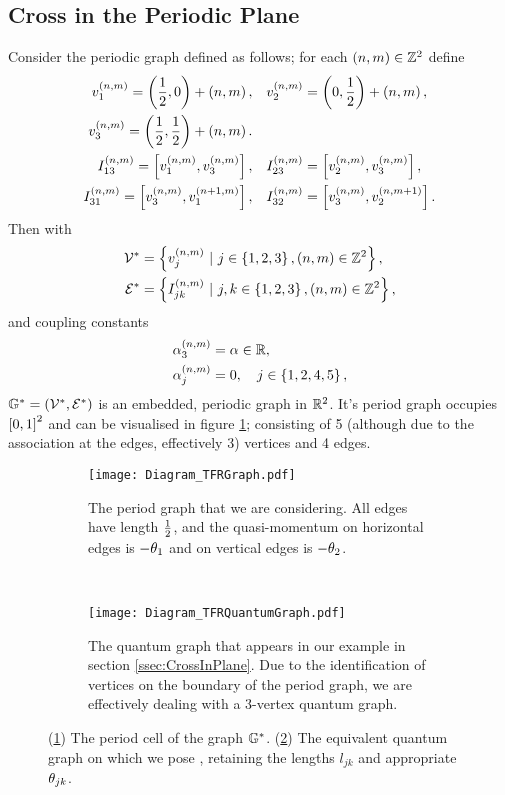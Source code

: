 \subsection{Cross in the Periodic Plane} \label{ssec:ExampleCrossInPlane}
Consider the periodic graph defined as follows; for each $\left( n,m \right)\in\mathbb{Z}^2$ define
\begin{align*}
	v_1^{\left( n,m \right)} = \left( \frac{1}{2},0 \right) + \left( n,m \right), 
	&\quad v_2^{\left( n,m \right)} = \left( 0,\frac{1}{2} \right) + \left( n,m \right), \\
	v_3^{\left( n,m \right)} = \left( \frac{1}{2},\frac{1}{2} \right) + \left( n,m \right). & \\
	I_{13}^{\left( n,m \right)} = \left[ v_1^{\left( n,m \right)}, v_3^{\left( n,m \right)} \right],
	&\quad I_{23}^{\left( n,m \right)} = \left[ v_2^{\left( n,m \right)}, v_3^{\left( n,m \right)} \right], \\
	I_{31}^{\left( n,m \right)} = \left[ v_3^{\left( n,m \right)}, v_1^{\left( n+1,m \right)} \right],
	&\quad I_{32}^{\left( n,m \right)} = \left[ v_3^{\left( n,m \right)}, v_2^{\left( n,m+1 \right)} \right].
\end{align*}
Then with 
\begin{align*}
	\vertSet^* &= \clbracs{v_j^{\bracs{n,m}} \ \vert \ j\in\clbracs{1,2,3}, \bracs{n,m}\in\integers^2}, \\
	\edgeSet^* &= \clbracs{I_{jk}^{\bracs{n,m}} \ \vert \ j,k\in\clbracs{1,2,3}, \bracs{n,m}\in\integers^2},
\end{align*}
and coupling constants
\begin{align*}
	\alpha_3^{\left( n,m \right)} &= \alpha \in\mathbb{R}, \\
	\alpha_j^{\left( n,m \right)} &= 0, \quad j\in\left\{ 1,2,4,5 \right\},
\end{align*}
$\mathbb{G}^* = \left( \mathcal{V}^*,\mathcal{E}^* \right)$ is an embedded, periodic graph in $\mathbb{R}^2$.
It's period graph occupies $\left[ 0,1 \right]^2$ and can be visualised in figure \ref{fig:Diagram_TFRGraph}; consisting of 5 (although due to the association at the edges, effectively 3) vertices and 4 edges.
\begin{figure}[b!]
	\centering
	\begin{subfigure}[t]{0.45\textwidth}
		\centering
		\texttt{[image: Diagram\_TFRGraph.pdf]}
		\caption{\label{fig:Diagram_TFRGraph} The period graph that we are considering. All edges have length $\frac{1}{2}$, and the quasi-momentum on horizontal edges is $-\theta_1$ and on vertical edges is $-\theta_2$.}
	\end{subfigure}
	~
	\begin{subfigure}[t]{0.45\textwidth}
		\centering
		\texttt{[image: Diagram\_TFRQuantumGraph.pdf]}
		\caption{\label{fig:Diagram_TFRQuantumGraph} The quantum graph that appears in our example in section \ref{ssec:CrossInPlane}. Due to the identification of vertices on the boundary of the period graph, we are effectively dealing with a 3-vertex quantum graph.}
	\end{subfigure}
	\caption{\label{fig:5VertexCross} (\ref{fig:Diagram_TFRGraph}) The period cell of the graph $\mathbb{G}^*$. (\ref{fig:Diagram_TFRQuantumGraph}) The equivalent quantum graph on which we pose , retaining the lengths $l_{jk}$ and appropriate $\theta_{jk}$.}
\end{figure}

